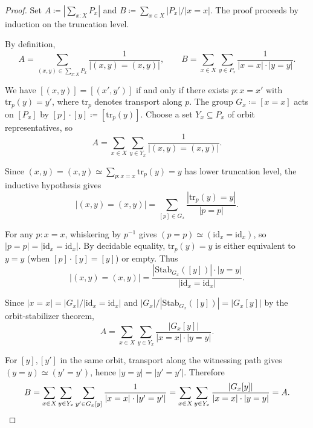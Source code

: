 \documentclass[10pt,a4paper]{amsart}
\newcommand{\Id}{\mathrm{id}}
\newcommand{\Stab}{\mathrm{Stab}}
\newcommand{\tr}{\mathrm{tr}}
\begin{document}
\begin{proof}
Set $A \coloneqq |\sum_{x:X}P_x|$ and $B \coloneqq \sum_{x\in X}|P_x|/|x=x|$. The proof proceeds by induction on the truncation level.

By definition,
\[
A = \sum_{(x,y)\in\sum_{x:X}P_x}\frac{1}{|(x,y)=(x,y)|},\qquad B = \sum_{x\in X}\sum_{y\in P_x}\frac{1}{|x=x|\cdot|y=y|}.
\]

We have $[(x,y)]=[(x',y')]$ if and only if there exists $p:x=x'$ with $\tr_p(y)=y'$, where $\tr_p$ denotes transport along $p$. The group $G_x \coloneqq [x=x]$ acts on $[P_x]$ by $[p]\cdot[y] \coloneqq [\tr_p(y)]$. Choose a set $Y_x\subseteq P_x$ of orbit representatives, so
\[
A = \sum_{x\in X}\sum_{y\in Y_x}\frac{1}{|(x,y)=(x,y)|}.
\]

Since $(x,y)=(x,y)\simeq\sum_{p:x=x}\tr_p(y)=y$ has lower truncation level, the inductive hypothesis gives
\[
|(x,y)=(x,y)| = \sum_{[p]\in G_x}\frac{|\tr_p(y)=y|}{|p=p|}.
\]

For any $p:x=x$, whiskering by $p^{-1}$ gives $(p=p)\simeq(\Id_x=\Id_x)$, so $|p=p|=|\Id_x=\Id_x|$. By decidable equality, $\tr_p(y)=y$ is either equivalent to $y=y$ (when $[p]\cdot[y]=[y]$) or empty. Thus
\[
|(x,y)=(x,y)| = \frac{|\Stab_{G_x}([y])|\cdot|y=y|}{|\Id_x=\Id_x|}.
\]

Since $|x=x|=|G_x|/|\Id_x=\Id_x|$ and $|G_x|/|\Stab_{G_x}([y])|=|G_x[y]|$ by the orbit-stabilizer theorem,
\[
A = \sum_{x\in X}\sum_{y\in Y_x}\frac{|G_x[y]|}{|x=x|\cdot|y=y|}.
\]

For $[y],[y']$ in the same orbit, transport along the witnessing path gives $(y=y)\simeq(y'=y')$, hence $|y=y|=|y'=y'|$. Therefore
\[
B = \sum_{x\in X}\sum_{y\in Y_x}\sum_{y'\in G_x[y]}\frac{1}{|x=x|\cdot|y'=y'|} = \sum_{x\in X}\sum_{y\in Y_x}\frac{|G_x[y]|}{|x=x|\cdot|y=y|} = A.\qedhere
\]
\end{proof}
\end{document}
